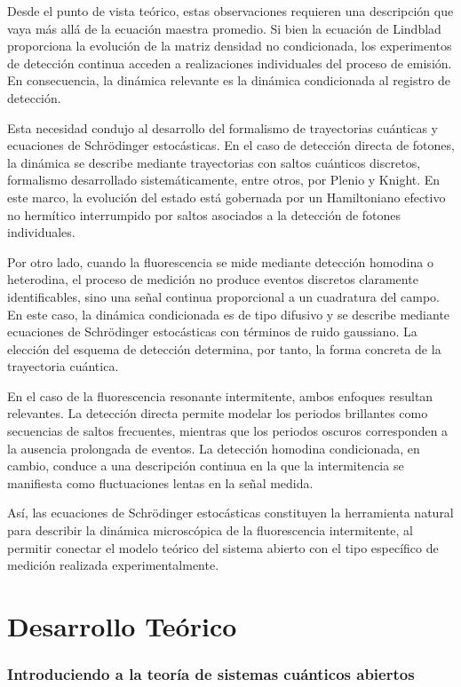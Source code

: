 \documentclass[11pt]{report}
\begin{document}
Desde el punto de vista teórico, estas observaciones requieren una descripción que vaya más allá de la ecuación maestra promedio. Si bien la ecuación de Lindblad proporciona la evolución de la matriz densidad no condicionada, los experimentos de detección continua acceden a realizaciones individuales del proceso de emisión. En consecuencia, la dinámica relevante es la dinámica condicionada al registro de detección.

Esta necesidad condujo al desarrollo del formalismo de trayectorias cuánticas y ecuaciones de Schrödinger estocásticas. En el caso de detección directa de fotones, la dinámica se describe mediante trayectorias con saltos cuánticos discretos, formalismo desarrollado sistemáticamente, entre otros, por Plenio y Knight. En este marco, la evolución del estado está gobernada por un Hamiltoniano efectivo no hermítico interrumpido por saltos asociados a la detección de fotones individuales.

Por otro lado, cuando la fluorescencia se mide mediante detección homodina o heterodina, el proceso de medición no produce eventos discretos claramente identificables, sino una señal continua proporcional a un cuadratura del campo. En este caso, la dinámica condicionada es de tipo difusivo y se describe mediante ecuaciones de Schrödinger estocásticas con términos de ruido gaussiano. La elección del esquema de detección determina, por tanto, la forma concreta de la trayectoria cuántica.

En el caso de la fluorescencia resonante intermitente, ambos enfoques resultan relevantes. La detección directa permite modelar los periodos brillantes como secuencias de saltos frecuentes, mientras que los periodos oscuros corresponden a la ausencia prolongada de eventos. La detección homodina condicionada, en cambio, conduce a una descripción continua en la que la intermitencia se manifiesta como fluctuaciones lentas en la señal medida.

Así, las ecuaciones de Schrödinger estocásticas constituyen la herramienta natural para describir la dinámica microscópica de la fluorescencia intermitente, al permitir conectar el modelo teórico del sistema abierto con el tipo específico de medición realizada experimentalmente.
\chapter{Desarrollo Teórico}
\subsection{Introduciendo a la teoría de sistemas cuánticos abiertos}
\end{document}
